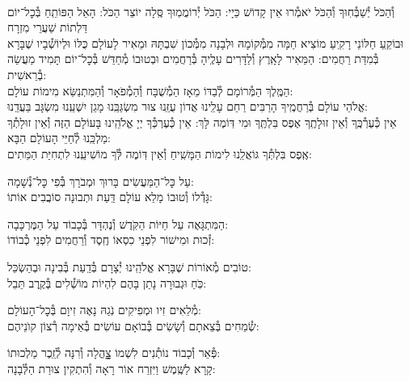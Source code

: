 \documentclass[twoside, openany, parskip=half, 11pt]{book}
\begin{document}
\\
\shatz {}
וְ֯הַכֹּל יְ֯שַׁבְּ֯חֽוּךָ וְ֯הַכֹּל יֹאמְ֯רוּ אֵין קָדוֹשׁ כַּיָי:\hfill \break
\kahal הַכֹּל יְ֯רוֹמֲמֽוּךָ סֶּֽלָה יוֹצֵר הַכֹּל: הָאֵל הַפּוֹתֵֽחַ בְּ֯כׇל־יוֹם דַּלְתוֹת שַׁעֲרֵי מִזְרָח\\
\shatz וּבוֹקֵֽעַ חַלּוֹנֵי רָקִֽיעַ מוֹצִיא חַמָּה מִמְּ֯קוֹמָהּ וּלְבָנָה מִמְּ֯כוֹן שִׁבְתָּהּ
\kahal וּמֵאִיר לָעוֹלָם כֻּלּוֹ וּלְיוֹשְׁ֯בָיו שֶׁבָּרָא בְּ֯מִדַּת רַחֲמִים: \hfill \break
\shatz הַמֵּאִיר לָאָֽרֶץ וְ֯לַדָּרִים עָלֶֽיהָ בְּ֯רַחֲמִים וּבְטוּבוֹ מְ֯חַדֵּשׁ בְּ֯כׇל־יוֹם תָּמִיד מַעֲשֵׂה בְ֯רֵאשִׁית: \\
\kahal הַמֶּֽלֶךְ הַמְּ֯רוֹמָם לְ֯בַדּוֹ מֵאָז הַמְ֯שֻׁבָּח וְ֯הַמְ֯פֹאָר וְ֯הַמִּתְנַשֵּׂא מִימוֹת עוֹלָם: \\
\shatz אֱלֹהֵי עוֹלָם בְּ֯רַחֲמֶֽיךָ הָרַבִּים רַחֵם עָלֵֽינוּ אֲדוֹן עֻזֵּֽנוּ צוּר מִשְׂגַּבֵּֽנוּ מָגֵן יִשְׁעֵֽנוּ מִשְׂגָּב בַּעֲדֵֽנוּ: \\
\kahal אֵין כְּ֯עֶרְ֯כֶּֽךָ וְ֯אֵין זוּלָתֶֽךָ אֶפֶס בִּלְתֶּֽךָ וּמִי דּֽוֹמֶה לָּךְ: \hfill \break
\shatz אֵין כְּ֯עֶרְכְּ֯ךָ יְיָ אֱלֹהֵֽינוּ בָּעוֹלָם הַזֶּה וְ֯אֵין זוּלָתְ֯ךָ מַלְכֵּֽנוּ לְ֯חַיֵּי הָעוֹלָם הַבָּא:\\
\kahal אֶֽפֶס בִּלְתְּ֯ךָ גּוֹאֲלֵֽנוּ לִימוֹת הַמָּשִֽׁיחַ וְ֯אֵין דּֽוֹמֶה לְּ֯ךָ מוֹשִׁיעֵֽנוּ לִתְחִיַּת הַמֵּתִים:

\shatz {}
עַל כׇּל־הַמַּעֲשִׂים \hfill בָּרוּךְ וּמְבֹרָךְ בְּ֯פִי כׇּל־נְ֯שָׁמָה: \\
\kahal גָּדְ֯לוֹ וְ֯טוּבוֹ מָלֵא עוֹלָם \hfill דַּֽעַת וּתְבוּנָה סוֹבֲבִים אוֹתוֹ:

\shatz הַמִּתְגָּאֶה עַל חַיּוֹת הַקֹּֽדֶשׁ \hfill וְ֯נֶהְדָּר בְּ֯כָבוֹד עַל הַמֶּרְכָּבָה:\\
\kahal זְ֯כוּת וּמִישׁוֹר לִפְנֵי כִסְאוֹ \hfill חֶֽסֶד וְ֯רַחֲמִים לִפְנֵי כְ֯בוֹדוֹ:

\shatz טוֹבִים מְ֯אוֹרוֹת שֶׁבָּרָא אֱלֹהֵֽינוּ \hfill יְ֯צָרָם בְּ֯דַֽעַת בְּ֯בִינָה וּבְהַשְׂכֵּל:\\
\kahal כֹּֽחַ וּגְבוּרָה נָתַן בָּהֶם \hfill לִהְיוֹת מוֹשְׁ֯לִים בְּ֯קֶֽרֶב תֵּבֵל:

\shatz מְ֯לֵאִים זִיו וּמְפִיקִים נֹֽגַהּ \hfill נָאֶה זִיוָם בְּ֯כׇל־הָעוֹלָם: \\
\kahal שְׂ֯מֵחִים בְּ֯צֵאתָם וְ֯שָׂשִׂים בְּ֯בוֹאָם \hfill עוֹשִׂים בְּ֯אֵימָה רְ֯צוֹן קוׂנֵיהֶם:

\shatz פְּ֯אֵר וְ֯כָבוֹד נוֹתְ֯נִים לִשְׁמוֹ \hfill צׇׇׇׇהֳלָה וְ֯רִנָּה לְ֯זֵֽכֶר מַלְכוּתוֹ: \\
\kahal קָרָא לַשֶּֽׁמֶשׁ וַיִּזְרַח אוֹר \hfill רָאָה וְ֯הִתְקִין צוּרַת הַלְּ֯בָנָה:
\end{document}
